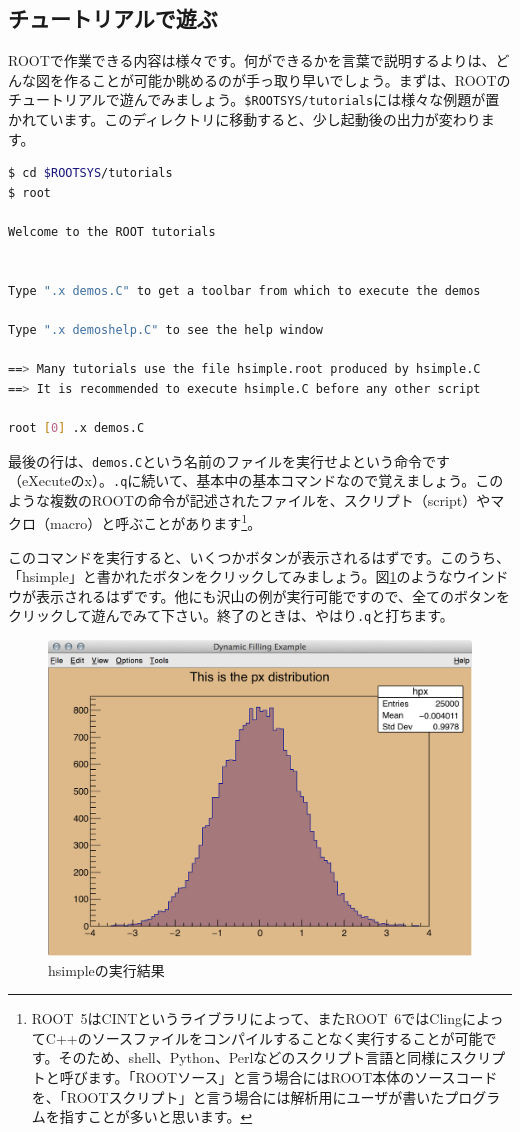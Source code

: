\subsection{チュートリアルで遊ぶ}
\label{subsec_tutorial}
ROOTで作業できる内容は様々です。何ができるかを言葉で説明するよりは、どんな図を作ることが可能か眺めるのが手っ取り早いでしょう。まずは、ROOTのチュートリアルで遊んでみましょう。\texttt{\$ROOTSYS/tutorials}には様々な例題が置かれています。このディレクトリに移動すると、少し起動後の出力が変わります。
\begin{lstlisting}[language=bash]
$ cd $ROOTSYS/tutorials
$ root

Welcome to the ROOT tutorials


Type ".x demos.C" to get a toolbar from which to execute the demos

Type ".x demoshelp.C" to see the help window

==> Many tutorials use the file hsimple.root produced by hsimple.C
==> It is recommended to execute hsimple.C before any other script

root [0] .x demos.C
\end{lstlisting}
最後の行は、\texttt{demos.C}という名前のファイルを実行せよという命令です（eXecuteのx）。\texttt{.q}に続いて、基本中の基本コマンドなので覚えましょう。このような複数のROOTの命令が記述されたファイルを、スクリプト（script）やマクロ（macro）と呼ぶことがあります\footnote{ROOT~5はCINTというライブラリによって、またROOT~6ではClingによってC++のソースファイルをコンパイルすることなく実行することが可能です。そのため、shell、Python、Perlなどのスクリプト言語と同様にスクリプトと呼びます。「ROOTソース」と言う場合にはROOT本体のソースコードを、「ROOTスクリプト」と言う場合には解析用にユーザが書いたプログラムを指すことが多いと思います。}。

このコマンドを実行すると、いくつかボタンが表示されるはずです。このうち、「hsimple」と書かれたボタンをクリックしてみましょう。図\ref{fig_hsimple}のようなウインドウが表示されるはずです。他にも沢山の例が実行可能ですので、全てのボタンをクリックして遊んでみて下さい。終了のときは、やはり\texttt{.q}と打ちます。

\begin{figure}
  \centering
  \includegraphics[width=12cm]{fig/hsimple.png}
  \caption{hsimpleの実行結果}
  \label{fig_hsimple}
\end{figure}

